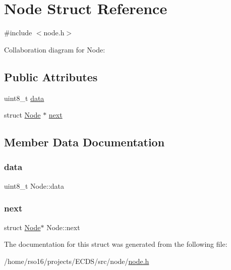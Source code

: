 \hypertarget{structNode}{}\section{Node Struct Reference}
\label{structNode}


{\ttfamily \#include $<$node.\+h$>$}



Collaboration diagram for Node\+:
\subsection*{Public Attributes}
\begin{DoxyCompactItemize}
\item 
uint8\+\_\+t \hyperlink{structNode_a1b476c7f284ed5e4fc7ab5a10c8fec24}{data}
\item 
struct \hyperlink{structNode}{Node} $\ast$ \hyperlink{structNode_af67b110ca1a258b793bf69d306929b22}{next}
\end{DoxyCompactItemize}


\subsection{Member Data Documentation}
\mbox{\label{structNode_a1b476c7f284ed5e4fc7ab5a10c8fec24}} 
\subsubsection{\texorpdfstring{data}{data}}
{\footnotesize\ttfamily uint8\+\_\+t Node\+::data}

\mbox{\label{structNode_af67b110ca1a258b793bf69d306929b22}} 
\subsubsection{\texorpdfstring{next}{next}}
{\footnotesize\ttfamily struct \hyperlink{structNode}{Node}$\ast$ Node\+::next}



The documentation for this struct was generated from the following file\+:\begin{DoxyCompactItemize}
\item 
/home/rso16/projects/\+E\+C\+D\+S/src/node/\hyperlink{node_8h}{node.\+h}\end{DoxyCompactItemize}
